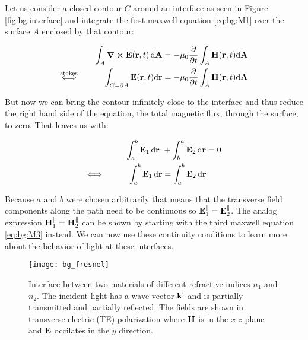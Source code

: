 Let us consider a closed contour $C$ around an interface as seen in Figure \ref{fig:bg:interface} and integrate the first maxwell equation \eqref{eq:bg:M1} over the surface $A$ enclosed by that contour:

\begin{equation}
\begin{aligned}
    \int_A \curl \vb E(\vb r, t) \, \dd \vb A
    &= - \mu_0 \pdv t \int_A \vb H(\vb r, t) \dd \vb A\\
    \overset{\mathrm{stokes}}{\Longleftrightarrow} \hspace{3em}
    \int_{C = \partial A} \vb E(\vb r, t) \dd \vb r
    &= - \mu_0 \pdv t \int_A \vb H(\vb r, t) \dd \vb A\\
\end{aligned}
\end{equation}

But now we can bring the contour infinitely close to the interface and thus reduce the right hand side of the equation, the total magnetic flux, through the surface, to zero. That leaves us with:

\begin{equation}
\begin{aligned}
    \int_a^b \vb E_1 \, \dd \vb r \ &+ \int_b^a \vb E_2 \,  \dd \vb r = 0\\
    \Longleftrightarrow \hspace{3em}
    \int_a^b \vb E_1 \, \dd \vb r &= \int_a^b \vb E_2 \,  \dd \vb r \\
\end{aligned}
\end{equation}

Because $a$ and $b$ were chosen arbitrarily that means that the transverse field components along the path need to be continuous so
$\vb E_1^{\parallel} = \vb E_2^{\parallel}$.
The analog expression
$\vb H_1^{\parallel} = \vb H_2^{\parallel}$
can be shown by starting with the third maxwell equation \eqref{eq:bg:M3} instead. We can now use these continuity conditions to learn more about the behavior of light at these interfaces.

\begin{figure}[H]
    \centering
    \texttt{[image: bg\_fresnel]}
    \caption{Interface between two materials of different refractive indices $n_1$ and $n_2$. The incident light has a wave vector $\vb k^{\mathrm{i}}$ and is partially transmitted and partially reflected. The fields are shown in transverse electric (TE) polarization where $\vb H$ is in the $x$-$z$ plane and $\vb E$ occilates in the $y$ direction.}
    \label{fig:bg:fresnel}
\end{figure}

